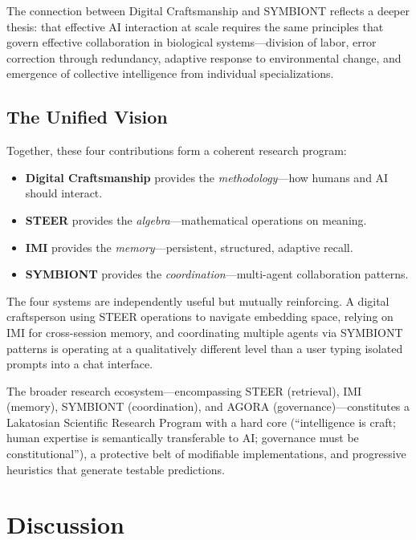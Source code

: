 \documentclass[11pt,a4paper]{article}
\begin{document}
The connection between Digital Craftsmanship and SYMBIONT reflects a deeper thesis: that effective AI interaction at scale requires the same principles that govern effective collaboration in biological systems---division of labor, error correction through redundancy, adaptive response to environmental change, and emergence of collective intelligence from individual specializations.

\subsection{The Unified Vision}

Together, these four contributions form a coherent research program:

\begin{itemize}
    \item \textbf{Digital Craftsmanship} provides the \emph{methodology}---how humans and AI should interact.
    \item \textbf{STEER} provides the \emph{algebra}---mathematical operations on meaning.
    \item \textbf{IMI} provides the \emph{memory}---persistent, structured, adaptive recall.
    \item \textbf{SYMBIONT} provides the \emph{coordination}---multi-agent collaboration patterns.
\end{itemize}

The four systems are independently useful but mutually reinforcing. A digital craftsperson using STEER operations to navigate embedding space, relying on IMI for cross-session memory, and coordinating multiple agents via SYMBIONT patterns is operating at a qualitatively different level than a user typing isolated prompts into a chat interface.

The broader research ecosystem---encompassing STEER (retrieval), IMI (memory), SYMBIONT (coordination), and AGORA (governance)---constitutes a Lakatosian Scientific Research Program \citep{lakatos1978} with a hard core (``intelligence is craft; human expertise is semantically transferable to AI; governance must be constitutional''), a protective belt of modifiable implementations, and progressive heuristics that generate testable predictions.

\section{Discussion}
\label{sec:discussion}
\end{document}
